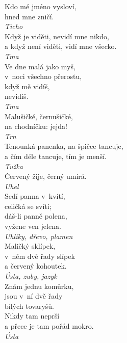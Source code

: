 \begin{multicols}{4}
\noindent
Kdo mé jméno vysloví,\\
hned mne zničí.\\[1 mm]
{\sl Ticho}\\

\noindent
Když je viděti, nevidí mne nikdo,\\
a když není viděti, vidí mne všecko.\\[1 mm]
{\sl Tma}\\

\noindent
Ve dne malá jako myš,\\
v~noci všechno přerostu,\\
když mě vidíš,\\
nevidíš.\\[1 mm]
{\sl Tma}\\

\noindent
Malušičké, černušičké,\\
na chodníčku: jejda!\\[1 mm]
{\sl Trn}\\

\noindent
Tenounká panenka, na špičce tancuje,\\
a čím déle tancuje, tím je menší.\\[1 mm]
{\sl Tužka}\\

\noindent
Červený žije, černý umírá.\\[1 mm]
{\sl Uhel}\\

\noindent
Sedí panna v~kvítí,\\
celičká se svítí;\\
dáš-li panně polena,\\
vyžene ven jelena.\\[1 mm]
{\sl Uhlíky, dřevo, plamen}\\

\noindent
Maličký sklípek,\\
v~něm dvě řady slípek\\
a červený kohoutek.\\[1 mm]
{\sl Ústa, zuby, jazyk}\\

\noindent
Znám jednu komůrku,\\
jsou v~ní dvě řady\\
bílých tovaryšů.\\
Nikdy tam neprší\\
a přece je tam pořád mokro.\\[1 mm]
{\sl Ústa}\\


\end{multicols}
